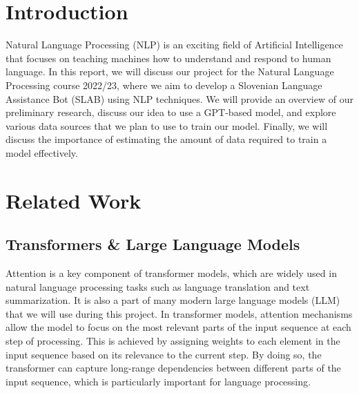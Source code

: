 \documentclass[fleqn,moreauthors,10pt]{ds_report}
\affiliation{\textit{Advisors: doc. dr. Slavko Žitnik}}
\begin{document}
\flushbottom 

\maketitle 

\thispagestyle{empty} 


\section*{Introduction}
	Natural Language Processing (NLP) is an exciting field of Artificial Intelligence that focuses on teaching machines how to understand and respond to human language. 
    In this report, we will discuss our project for the Natural Language Processing course 2022/23, where we aim to develop a Slovenian Language Assistance Bot (SLAB) using NLP techniques.
    We will provide an overview of our preliminary research, discuss our idea to use a GPT-based model, and explore various data sources that we plan to use to train our model.
    Finally, we will discuss the importance of estimating the amount of data required to train a model effectively.

    
\section*{Related Work}

\subsection*{Transformers \& Large Language Models}
Attention \cite{vaswani2017attention} is a key component of transformer models, which are widely used in natural language processing tasks such as language translation and text summarization.
It is also a part of many modern large language models (LLM) that we will use during this project.
In transformer models, attention mechanisms allow the model to focus on the most relevant parts of the input sequence at each step of processing.
This is achieved by assigning weights to each element in the input sequence based on its relevance to the current step.
By doing so, the transformer can capture long-range dependencies between different parts of the input sequence, which is particularly important for language processing.
\end{document}
